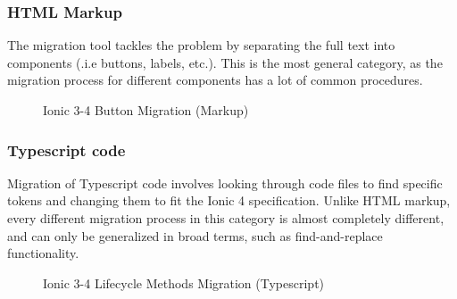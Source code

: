 \documentclass[conference]{IEEEtran}
\begin{document}
\subsubsection{HTML Markup}
The migration tool tackles the problem by separating the full
text into components (.i.e buttons, labels, etc.). This is the most
general category, as the migration process for different components
has a lot of common procedures.
\begin{figure}[!htb]
    \centering
    \qquad
    \caption{Ionic 3-4 Button Migration (Markup)}
    \label{fig:ionicButtonMigration}
\end{figure}

\subsubsection{Typescript code}
Migration of Typescript code involves looking through code files
to find specific tokens and changing them to fit the Ionic 4 specification.
Unlike HTML markup, every different migration process in this category is almost
completely different, and can only be generalized in broad terms, such as find-and-replace
functionality.
\begin{figure}[!htb]
    \centering
    \qquad
    \caption{Ionic 3-4 Lifecycle Methods Migration (Typescript)}
    \label{fig:ionicLifecycleMigration}
\end{figure}
\end{document}
